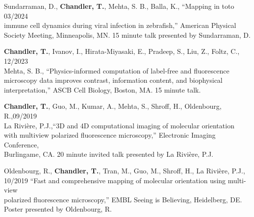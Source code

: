 \documentclass[12pt,letterpaper]{article}
\begin{document}
\nocite{*}
\setlength{}
\printbibliography[heading=none, type=article, sorting=ynt, resetnumbers=true]

\begin{benumerate}{12}



\item {Sundarraman, D., \textbf{Chandler, T.}, Mehta, S. B., Balla, K., ``Mapping in toto \hfill 03/2024\\ immune cell dynamics during viral infection in zebrafish,'' American Physical\\ Society Meeting, Minneapolis, MN. 15 minute talk presented by Sundarraman, D.}

\item {\textbf{Chandler, T.}, Ivanov, I., Hirata-Miyasaki, E., Pradeep, S., Liu, Z., Foltz, C., \hfill 12/2023\\ Mehta, S. B., ``Physics-informed computation of label-free and fluorescence\\ microscopy data improves contrast, information content, and biophysical\\ interpretation,'' ASCB Cell Biology, Boston, MA. 15 minute talk.}

\item {\textbf{Chandler, T.}, Guo, M., Kumar, A., Mehta, S., Shroff, H., Oldenbourg, R.,\hfill 09/2019\\ La Rivi\`ere, P.J.,``3D and 4D computational imaging of molecular orientation\\ with multiview polarized fluorescence microscopy,'' Electronic Imaging Conference,\\ Burlingame, CA. 20 minute invited talk presented by La Rivi\`ere, P.J.}

\item {Oldenbourg, R., \textbf{Chandler, T.}, Tran, M., Guo, M., Shroff, H., La Rivi\`ere, P.J., \hfill 10/2019 ``Fast and comprehensive mapping of molecular orientation using multi-view\\polarized fluorescence microscopy,'' EMBL Seeing is Believing, Heidelberg, DE.\\ Poster presented by Oldenbourg, R.}


\end{benumerate}
\end{document}
